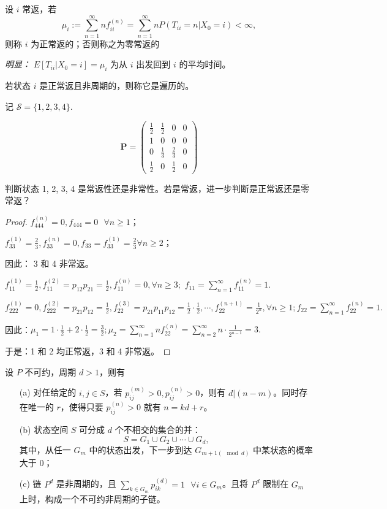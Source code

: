 \documentclass[lang=cn,10pt,thmcnt=section]{elegantbook}
\begin{document}
\begin{definition}[正常返状态]
设 $i$ 常返，若
\[
\mu_i := \sum_{n=1}^{\infty} n f_{ii}^{(n)} = \sum_{n=1}^{\infty} n P(T_{ii} = n | X_0 = i) < \infty,
\]
则称 $i$ 为正常返的；否则称之为零常返的
\end{definition}

\textit{明显：} $E[T_{ii} | X_0 = i] = \mu_i$ 为从 $i$ 出发回到 $i$ 的平均时间。
\begin{definition}[遍历性]
	若状态 $i$ 是正常返且非周期的，则称它是遍历的。
\end{definition}
\begin{example}
	记 $\mathcal{S} = \{1, 2, 3, 4\}$.

\[
\mathbf{P} = \left(
\begin{array}{cccc}
\frac{1}{2} & \frac{1}{2} & 0 & 0  \\
1 & 0 & 0 & 0 \\
0 & \frac{1}{3} & \frac{2}{3} & 0 \\
\frac{1}{2} & 0 & \frac{1}{2} & 0
\end{array}
\right)
\]

判断状态 1, 2, 3, 4 是常返性还是非常性。若是常返，进一步判断是正常返还是零常返？
\end{example}
\begin{proof}
	$f_{444}^{(n)} = 0, f_{444} = 0 \ \ \ \forall n \geq 1$；

	 $f_{33}^{(1)} = \frac{2}{3}, f_{33}^{(n)} = 0, f_{33} = f_{33}^{(1)} = \frac{2}{3} \forall n \geq 2$；

	因此：
	3 和 4 非常返。


	$f_{11}^{(1)} = \frac{1}{2}, f_{11}^{(2)} = p_{12} p_{21} = \frac{1}{2}, f_{11}^{(n)} = 0, \forall n \geq 3;$
	$f_{11} = \sum_{n=1}^{\infty} f_{11}^{(n)} = 1.$
	
	 $f_{222}^{(1)} = 0, f_{222}^{(2)} = p_{21} p_{12} = \frac{1}{2}, f_{22}^{(3)} = p_{21} p_{11} p_{12} = \frac{1}{2} \cdot \frac{1}{2}, \cdots, f_{22}^{(n+1)} = \frac{1}{2^n}, \forall n \geq 1; f_{22} = \sum_{n=1}^{\infty} f_{22}^{(n)} = 1.$
	
	因此：$\mu_1 = 1 \cdot \frac{1}{2} + 2 \cdot \frac{1}{2} = \frac{3}{2}; \mu_2 = \sum_{n=1}^{\infty} n f_{22}^{(n)} = \sum_{n=2}^{\infty} n \cdot \frac{1}{2^{n-1}} = 3.$
	
	于是：1 和 2 均正常返，3 和 4 非常返。
\end{proof}
\begin{theorem}
	设 $P$ 不可约，周期 $d > 1$，则有
\begin{enumerate}
    \item[(a)] 对任给定的 $i, j \in S$，若 $p_{ij}^{(m)} > 0, p_{ij}^{(n)} > 0$，则有 $d|(n-m)$。同时存在唯一的 $r$，使得只要 $p_{ij}^{(n)} > 0$ 就有 $n = kd + r$。
    \item[(b)] 状态空间 $S$ 可分成 $d$ 个不相交的集合的并：
    \[
    S = G_1 \cup G_2 \cup \cdots \cup G_d,
    \]
    其中，从任一 $G_m$ 中的状态出发，下一步到达 $G_{m+1(\mod d)}$ 中某状态的概率大于 $0$；
    \item[(c)] 链 $P^d$ 是非周期的，且 $\sum_{k \in G_m} p_{ik}^{(d)} = 1 \ \ \ \forall i \in G_m$。且将 $P^d$ 限制在 $G_m$ 上时，构成一个不可约非周期的子链。
\end{enumerate}

\end{theorem}
\end{document}
